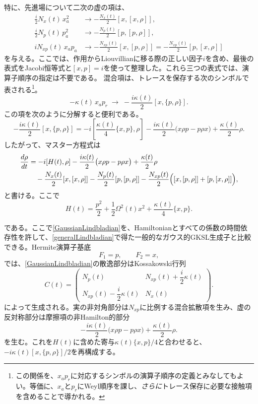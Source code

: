 \documentclass[a4paper,11pt,oneside]{article}
\theoremstyle{definition}
\numberwithin{equation}{section}
\begin{document}
特に、先進場について二次の虚の項は、
\begin{align}
\frac{i}{2}N_x(t)\,x_a^2
&\longrightarrow
-\frac{N_x(t)}{2}[x,[x,\rho]],
\\
\frac{i}{2}N_p(t)\,p_a^2
&\longrightarrow
-\frac{N_p(t)}{2}[p,[p,\rho]],
\\
iN_{xp}(t)\,x_a p_a
&\longrightarrow
-\frac{N_{xp}(t)}{2}
[x,[p,\rho]]
=-\frac{N_{xp}(t)}{2}
[p,[x,\rho]]
\end{align}
を与える。ここでは、作用からLiouvillianに移る際の正しい因子$i $を含め、最後の表式をJacobi恒等式と$ [x,p]=i$を使って整理した。これら三つの表式では、演算子順序の指定は不要である。
混合項は、トレースを保存する次のシンボルで表される\footnote{この関係を、$x_a p_r$に対応するシンボルの演算子順序の定義とみなしてもよい。等価に、$x_a$と$p_r$にWeyl順序を課し、\textit{さらに}トレース保存に必要な接触項を含めることで導かれる。}。
\begin{equation}
-\kappa(t)\,x_a p_r
\;\longrightarrow\;
-\frac{i\kappa(t)}{2}[x,\{p,\rho\}] .
\end{equation}
この項を次のように分解すると便利である。
\begin{equation}
-\frac{i\kappa(t)}{2}[x,\{p,\rho\}]
=
-i\left[\frac{\kappa(t)}{4}\{x,p\},\rho\right]
-\frac{i\kappa(t)}{2}\bigl(x\rho p-p\rho x\bigr)
+\frac{\kappa(t)}{2}\rho .
\end{equation}
したがって、マスター方程式は
\begin{align}
\label{GaussianLindbladian}
\frac{d\rho}{dt}
&=
-i[H(t),\rho]
-\frac{i\kappa(t)}{2}\bigl(x\rho p-p\rho x\bigr)
+\frac{\kappa(t)}{2}\rho
\nonumber\\
&\quad
-\frac{N_x(t)}{2}[x,[x,\rho]]
-\frac{N_p(t)}{2}[p,[p,\rho]]
-\frac{N_{xp}(t)}{2}
\Bigl(
[x,[p,\rho]]
+
[p,[x,\rho]]
\Bigr),
\end{align}
と書ける。ここで
\begin{equation}
H(t)
=
\frac{p^2}{2}
+
\frac{1}{2}\Omega^2(t)x^2
+
\frac{\kappa(t)}{4}\{x,p\}.
\end{equation}


である。ここで\eqref{GaussianLindbladian}を、Hamiltonianとすべての係数の時間依存性を許して、\eqref{generalLindbladian}で得た一般的なガウス的GKSL生成子と比較できる。Hermite演算子基底
\begin{equation}
F_1=p,
\qquad
F_2=x,
\end{equation}
では、\eqref{GaussianLindbladian}の散逸部分はKossakowski行列
\begin{equation}
\label{GaussianKossakowski}
C(t)
=
\begin{pmatrix}
N_p(t)
&
N_{xp}(t)+\dfrac{i}{2}\kappa(t)
\\[6pt]
N_{xp}(t)-\dfrac{i}{2}\kappa(t)
&
N_x(t)
\end{pmatrix}.
\end{equation}
によって生成される。実の非対角部分は$N_{xp}$に比例する混合拡散項を生み、虚の反対称部分は摩擦項の非Hamilton的部分
\begin{equation}
-\frac{i\kappa(t)}{2}\bigl(x\rho p-p\rho x\bigr)
+\frac{\kappa(t)}{2}\rho .
\end{equation}
を生む。これを$H(t)$に含めた寄与$\kappa(t)\{x,p\}/4$と合わせると、$-i\kappa(t)[x,\{p,\rho\}]/2$を再構成する。
\end{document}
